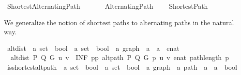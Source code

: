 %
\begin{isabellebody}%
%
%
\isadelimtheory
%
\endisadelimtheory
%
\isatagtheory
{}\isamarkupfalse%
\ Shortest{\isacharunderscore}{\kern0pt}Alternating{\isacharunderscore}{\kern0pt}Path\isanewline
\ \ \isanewline
\ \ \ \ Alternating{\isacharunderscore}{\kern0pt}Path\isanewline
\ \ \ \ Shortest{\isacharunderscore}{\kern0pt}Path\isanewline
{}%
\endisatagtheory
{\isafoldtheory}%
%
\isadelimtheory
%
\endisadelimtheory
%
\begin{isamarkuptext}%
We generalize the notion of shortest paths to alternating paths in the natural way.%
\end{isamarkuptext}\isamarkuptrue%
\isamarkupfalse%
\ alt{\isacharunderscore}{\kern0pt}dist\ {\isacharcolon}{\kern0pt}{\isacharcolon}{\kern0pt}\ {\isachardoublequoteopen}{\isacharparenleft}{\kern0pt}{\isacharprime}{\kern0pt}a\ set\ {\isasymRightarrow}\ bool{\isacharparenright}{\kern0pt}\ {\isasymRightarrow}\ {\isacharparenleft}{\kern0pt}{\isacharprime}{\kern0pt}a\ set\ {\isasymRightarrow}\ bool{\isacharparenright}{\kern0pt}\ {\isasymRightarrow}\ {\isacharprime}{\kern0pt}a\ graph\ {\isasymRightarrow}\ {\isacharprime}{\kern0pt}a\ {\isasymRightarrow}\ {\isacharprime}{\kern0pt}a\ {\isasymRightarrow}\ enat{\isachardoublequoteclose}\ \isanewline
\ \ {\isachardoublequoteopen}alt{\isacharunderscore}{\kern0pt}dist\ P\ Q\ G\ u\ v\ {\isasymequiv}\ INF\ p{\isasymin}{\isacharbraceleft}{\kern0pt}p{\isachardot}{\kern0pt}\ alt{\isacharunderscore}{\kern0pt}path\ P\ Q\ G\ p\ u\ v{\isacharbraceright}{\kern0pt}{\isachardot}{\kern0pt}\ enat\ {\isacharparenleft}{\kern0pt}path{\isacharunderscore}{\kern0pt}length\ p{\isacharparenright}{\kern0pt}{\isachardoublequoteclose}\isanewline
\isanewline
{}\isamarkupfalse%
\ is{\isacharunderscore}{\kern0pt}shortest{\isacharunderscore}{\kern0pt}alt{\isacharunderscore}{\kern0pt}path\ {\isacharcolon}{\kern0pt}{\isacharcolon}{\kern0pt}\ {\isachardoublequoteopen}{\isacharparenleft}{\kern0pt}{\isacharprime}{\kern0pt}a\ set\ {\isasymRightarrow}\ bool{\isacharparenright}{\kern0pt}\ {\isasymRightarrow}\ {\isacharparenleft}{\kern0pt}{\isacharprime}{\kern0pt}a\ set\ {\isasymRightarrow}\ bool{\isacharparenright}{\kern0pt}\ {\isasymRightarrow}\ {\isacharprime}{\kern0pt}a\ graph\ {\isasymRightarrow}\ {\isacharprime}{\kern0pt}a\ path\ {\isasymRightarrow}\ {\isacharprime}{\kern0pt}a\ {\isasymRightarrow}\ {\isacharprime}{\kern0pt}a\ {\isasymRightarrow}\ bool{\isachardoublequoteclose}\ \isanewline

\end{isabellebody}
